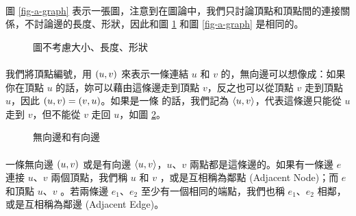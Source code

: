 \documentclass[12pt,a4paper,oneside]{report}
\begin{document}
\begin{CJK}{UTF8}{bkai}
\paragraph{}圖 \ref{fig-a-graph} 表示一張圖，注意到在圖論中，我們只討論頂點和頂點間的連接關係，不討論邊的長度、形狀，因此和圖 \ref{fig-another-graph} 和圖 \ref{fig-a-graph} 是相同的。
\begin{figure}[h!]
\centering
\label{fig-another-graph}
\caption{圖不考慮大小、長度、形狀}
\end{figure}

\paragraph{}我們將頂點編號，用 $({u},{v})$ 來表示一條連結 $u$ 和 $v$ 的\textbf{}，無向邊可以想像成：如果你在頂點 $u$ 的話，妳可以藉由這條邊走到頂點 $v$，反之也可以從頂點 $v$ 走到頂點 $u$，因此 $({u},{v})=({v},{u})$。如果是一條\textbf{} 的話，我們記為 $\langle{}{{u},{v}}\rangle{}$，代表這條邊只能從 $u$ 走到 $v$，但不能從 $v$ 走回 $u$，如圖 \ref{fig-edge-and-arc}。
\begin{figure}[h!]
\centering
\label{fig-edge-and-arc}
\caption{無向邊和有向邊}
\end{figure}
\paragraph{}一條無向邊 $({u},{v})$ 或是有向邊 $\langle{}{{u},{v}}\rangle{}$，$u$、$v$ 兩點都是這條邊的\textbf{}。如果有一條邊 $e$ 連接 $u$、$v$ 兩個頂點，我們稱 $u$ 和 $v$ \textbf{}，或是互相稱為鄰點 (Adjacent Node)；而 $e$ 和頂點 $u$、$v$ \textbf{}。若兩條邊 $e_1$、$e_2$ 至少有一個相同的端點，我們也稱 $e_1$、$e_2$ 相鄰，或是互相稱為鄰邊 (Adjacent Edge)。

\end{CJK}
\end{document}
